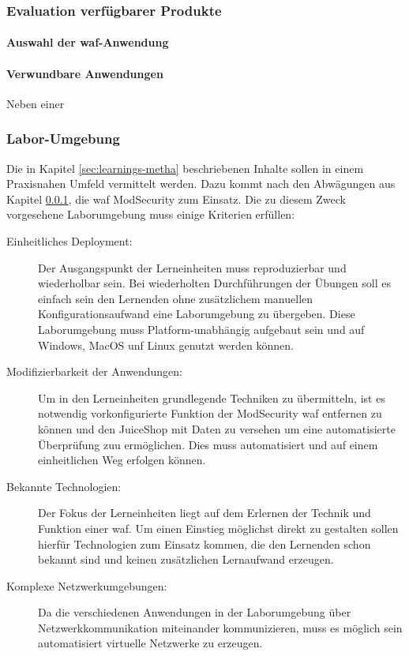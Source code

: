 \subsubsection{Evaluation verfügbarer Produkte}
\label{sec:product-evaluation}

\paragraph{Auswahl der \ac{waf}-Anwendung}


\paragraph{Verwundbare Anwendungen}

Neben einer 

\subsubsection{Labor-Umgebung}

Die in Kapitel \ref{sec:learnings-metha} beschriebenen Inhalte sollen in einem Praxisnahen Umfeld vermittelt werden.
Dazu kommt nach den Abwägungen aus Kapitel \ref{sec:product-evaluation}, die \ac{waf} ModSecurity zum Einsatz.
Die zu diesem Zweck vorgesehene Laborumgebung muss einige Kriterien erfüllen:
\begin{description}
    \item[Einheitliches Deployment:] Der Ausgangspunkt der Lerneinheiten muss reproduzierbar und wiederholbar sein. 
    Bei wiederholten Durchführungen der Übungen soll es einfach sein den Lernenden ohne zusätzlichem manuellen Konfigurationsaufwand eine Laborumgebung zu übergeben. 
    Diese Laborumgebung muss Platform-unabhängig aufgebaut sein und auf Windows, MacOS unf Linux genutzt werden können.
    \item[Modifizierbarkeit der Anwendungen:] Um in den Lerneinheiten grundlegende Techniken zu übermitteln, ist es notwendig vorkonfigurierte Funktion der ModSecurity \ac{waf} entfernen zu können und den JuiceShop mit Daten zu versehen um eine automatisierte Überprüfung zuu ermöglichen.
    Dies muss automatisiert und auf einem einheitlichen Weg erfolgen können.
    \item[Bekannte Technologien:] Der Fokus der Lerneinheiten liegt auf dem Erlernen der Technik und Funktion einer \ac{waf}. 
    Um einen Einstieg möglichst direkt zu gestalten sollen hierfür Technologien zum Einsatz kommen, die den Lernenden schon bekannt sind und keinen zusätzlichen Lernaufwand erzeugen.
    \item[Komplexe Netzwerkumgebungen:] Da die verschiedenen Anwendungen in der Laborumgebung über Netzwerkkommunikation miteinander kommunizieren, muss es möglich sein automatisiert virtuelle Netzwerke zu erzeugen.
\end{description}

